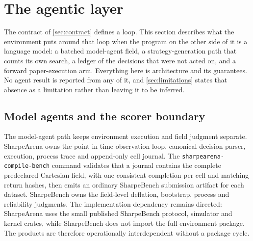 \section{The agentic layer}\label{sec:agentic}

The contract of \cref{sec:contract} defines a loop. This section describes what the environment puts around that loop when the program on the other side of it is a language model: a batched model-agent field, a strategy-generation path that counts its own search, a ledger of the decisions that were not acted on, and a forward paper-execution arm. Everything here is architecture and its guarantees. No agent result is reported from any of it, and \cref{sec:limitations} states that absence as a limitation rather than leaving it to be inferred.

\subsection{Model agents and the scorer boundary}\label{sec:local-field}

The model-agent path keeps environment execution and field judgment separate. SharpeArena owns the point-in-time observation loop, canonical decision parser, execution, process trace and append-only cell journal. The \texttt{sharpearena-compile-bench} command validates that a journal contains the complete predeclared Cartesian field, with one consistent completion per cell and matching return hashes, then emits an ordinary SharpeBench submission artifact for each dataset. SharpeBench owns the field-level deflation, bootstrap, process and reliability judgments. The implementation dependency remains directed: SharpeArena uses the small published SharpeBench protocol, simulator and kernel crates, while SharpeBench does not import the full environment package. The products are therefore operationally interdependent without a package cycle.

